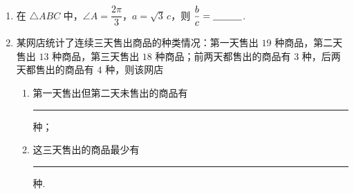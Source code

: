 \begin{description}
\begin{enumerate}[leftmargin=5pt]
        \item 在 \(\triangle ABC\) 中，\(\angle A=\dfrac{2\pi}{3}\)，\(a=\sqrt3\,c\)，则 \(\dfrac{b}{c}=\rule[-0.3ex]{3em}{0.4pt}\).

        \item 某网店统计了连续三天售出商品的种类情况：第一天售出 \(19\) 种商品，第二天售出 \(13\) 种商品，第三天售出 \(18\) 种商品；前两天都售出的商品有 \(3\) 种，后两天都售出的商品有 \(4\) 种，则该网店

\begin{enumerate}
\item 第一天售出但第二天未售出的商品有\rule[-0.3ex]{3em}{0.4pt} 种；
\item 这三天售出的商品最少有\rule[-0.3ex]{3em}{0.4pt} 种.
\end{enumerate}

    \end{enumerate}

\end{description}

